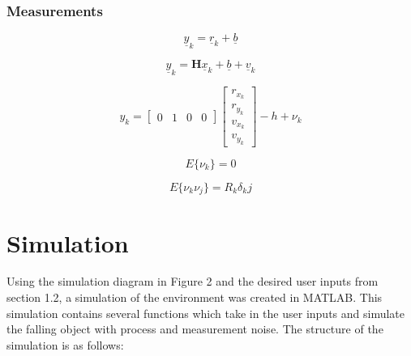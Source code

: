\documentclass{article}
\begin{document}
\subsubsection{Measurements}

\begin{equation}
    \underline{y}_k = \underline{r}_k + \underline{b}
\end{equation}

\begin{equation}
    \underline{y}_k = \mathbf{H}\underline{x}_k + \underline{b} + \underline{v}_k
\end{equation}

\begin{equation*}
    y_k = 
    \begin{bmatrix}
        0 & 1 & 0 & 0
    \end{bmatrix}
    \begin{bmatrix} r_{x_k} \\r_{y_k} \\v_{x_k} \\v_{y_k} \end{bmatrix} - h + \nu_k
\end{equation*}

\begin{equation*}
    E\{\nu_k\} = 0
\end{equation*}

\begin{equation*}
    E\{\nu_k \nu_j\} = R_k\delta_kj
\end{equation*}

\section{Simulation}
Using the simulation diagram in Figure 2 and the desired user inputs from section 1.2, a simulation of the environment was created in MATLAB. This simulation contains several functions which take in the user inputs and simulate the falling object with process and measurement noise. The structure of the simulation is as follows:
\end{document}
